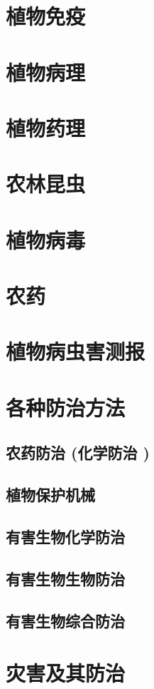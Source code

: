 \documentclass[UTF8]{../ApplicationUniverse}
\begin{document}
\section{植物免疫}
\section{植物病理}
\section{植物药理}
\section{农林昆虫}
\section{植物病毒}
\section{农药}
\section{植物病虫害测报}

\section{各种防治方法}
    \subsection{农药防治 (化学防治 )}
    \subsection{植物保护机械}
    \subsection{有害生物化学防治}
    \subsection{有害生物生物防治}
    \subsection{有害生物综合防治}


\section{灾害及其防治}
\end{document}
